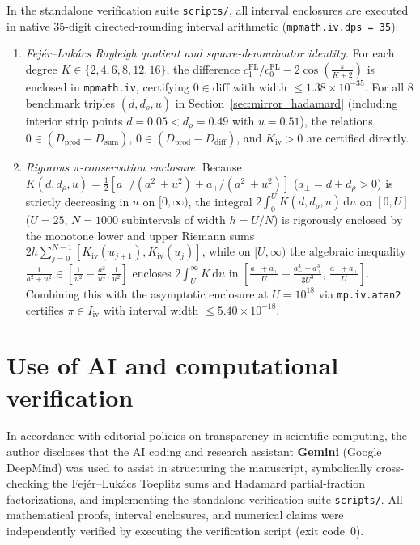 \documentclass[11pt,reqno]{amsart}
\theoremstyle{definition}
\theoremstyle{remark}
\numberwithin{equation}{section}
\newcommand{\dd}{\mathrm{d}}
\begin{document}
{\sloppy
In the standalone verification suite \texttt{scripts/}\allowbreak\texttt{}, all interval enclosures are executed in native 35-digit directed-rounding interval arithmetic (\texttt{mpmath.iv.dps = 35}):
\begin{enumerate}[label=\textup{(\arabic*)},leftmargin=2.2em]
\item \textit{Fej\'er--Luk\'acs Rayleigh quotient and square-denominator identity.} For each degree $K \in \{2, 4,\allowbreak 6, 8,\allowbreak 12, 16\}$, the difference $c_1^{\mathrm{FL}}/c_0^{\mathrm{FL}} - 2\cos(\frac{\pi}{K+2})$ is enclosed in \texttt{mpmath.iv}, certifying $0 \in \mathrm{diff}$ with width $\le 1.38 \times 10^{-35}$. For all $8$ benchmark triples $(d, d_\rho, u)$ in Section~\ref{sec:mirror_hadamard} (including interior strip points $d = 0.05 < d_\rho = 0.49$ with $u = 0.51$), the relations $0 \in (D_{\mathrm{prod}} -\allowbreak D_{\mathrm{sum}})$, $0 \in (D_{\mathrm{prod}} -\allowbreak D_{\mathrm{diff}})$, and $K_{\mathrm{iv}} > 0$ are certified directly.
\item \textit{Rigorous $\pi$-conservation enclosure.} Because $K(d, d_\rho, u) = \frac{1}{2}[a_-/(a_-^2 + u^2) + a_+/(a_+^2 + u^2)]$ ($a_\pm = d \pm d_\rho > 0$) is strictly decreasing in $u$ on $[0, \infty)$, the integral $2\int_0^U K(d, d_\rho, u)\,\dd u$ on $[0, U]$ ($U = 25$, $N = 1000$ subintervals of width $h = U/N$) is rigorously enclosed by the monotone lower and upper Riemann sums $2h\sum_{j=0}^{N-1} [K_{\mathrm{iv}}(u_{j+1}), K_{\mathrm{iv}}(u_j)]$, while on $[U, \infty)$ the algebraic inequality $\frac{1}{a^2 + u^2} \in [\frac{1}{u^2} - \frac{a^2}{u^4}, \frac{1}{u^2}]$ encloses $2\int_U^{\infty} K\,\dd u$ in $[\frac{a_- + a_+}{U} - \frac{a_-^3 + a_+^3}{3U^3},\, \frac{a_- + a_+}{U}]$. Combining this with the asymptotic enclosure at $U = 10^{18}$ via \texttt{mp.iv.atan2} certifies $\pi \in I_{\mathrm{iv}}$ with interval width $\le 5.40 \times 10^{-18}$.
\end{enumerate}\par}

\section*{Use of AI and computational verification}

{\sloppy
In accordance with editorial policies on transparency in scientific computing, the author discloses that the AI coding and research assistant \textbf{Gemini} (Google DeepMind) was used to assist in structuring the manuscript, symbolically cross-checking the Fej\'er--Luk\'acs Toeplitz sums and Hadamard partial-fraction factorizations, and implementing the standalone verification suite \texttt{scripts/}\allowbreak\texttt{}. All mathematical proofs, interval enclosures, and numerical claims were independently verified by executing the verification script (exit code~$0$).\par}
\end{document}
